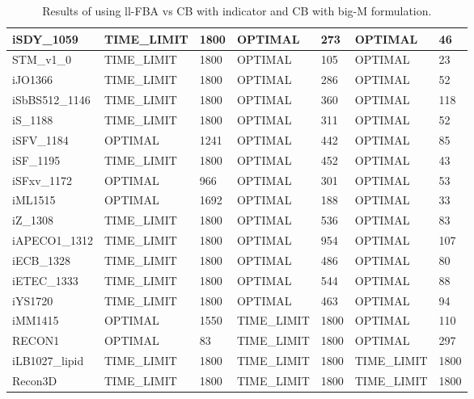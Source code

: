 \begin{table}[!ht]
\begin{tabular}{|l|l|l|l|l|l|l|}
        iSDY\_1059 & TIME\_LIMIT & 1800 & OPTIMAL & 273 & OPTIMAL & 46 \\ \hline
        STM\_v1\_0 & TIME\_LIMIT & 1800 & OPTIMAL & 105 & OPTIMAL & 23 \\ \hline
        iJO1366 & TIME\_LIMIT & 1800 & OPTIMAL & 286 & OPTIMAL & 52 \\ \hline
        iSbBS512\_1146 & TIME\_LIMIT & 1800 & OPTIMAL & 360 & OPTIMAL & 118 \\ \hline
        iS\_1188 & TIME\_LIMIT & 1800 & OPTIMAL & 311 & OPTIMAL & 52 \\ \hline
        iSFV\_1184 & OPTIMAL & 1241 & OPTIMAL & 442 & OPTIMAL & 85 \\ \hline
        iSF\_1195 & TIME\_LIMIT & 1800 & OPTIMAL & 452 & OPTIMAL & 43 \\ \hline
        iSFxv\_1172 & OPTIMAL & 966 & OPTIMAL & 301 & OPTIMAL & 53 \\ \hline
        iML1515 & OPTIMAL & 1692 & OPTIMAL & 188 & OPTIMAL & 33 \\ \hline
        iZ\_1308 & TIME\_LIMIT & 1800 & OPTIMAL & 536 & OPTIMAL & 83 \\ \hline
        iAPECO1\_1312 & TIME\_LIMIT & 1800 & OPTIMAL & 954 & OPTIMAL & 107 \\ \hline
        iECB\_1328 & TIME\_LIMIT & 1800 & OPTIMAL & 486 & OPTIMAL & 80 \\ \hline
        iETEC\_1333 & TIME\_LIMIT & 1800 & OPTIMAL & 544 & OPTIMAL & 88 \\ \hline
        iYS1720 & TIME\_LIMIT & 1800 & OPTIMAL & 463 & OPTIMAL & 94 \\ \hline
        iMM1415 & OPTIMAL & 1550 & TIME\_LIMIT & 1800 & OPTIMAL & 110 \\ \hline
        RECON1 & OPTIMAL & 83 & TIME\_LIMIT & 1800 & OPTIMAL & 297 \\ \hline
        iLB1027\_lipid & TIME\_LIMIT & 1800 & TIME\_LIMIT & 1800 & TIME\_LIMIT & 1800 \\ \hline
        Recon3D & TIME\_LIMIT & 1800 & TIME\_LIMIT & 1800 & TIME\_LIMIT & 1800 \\ \hline
    \end{tabular}
    \caption{\label{Tab:cb_vs_llfba} Results of using ll-FBA vs CB with indicator and CB with big-M formulation.}
\end{table}

